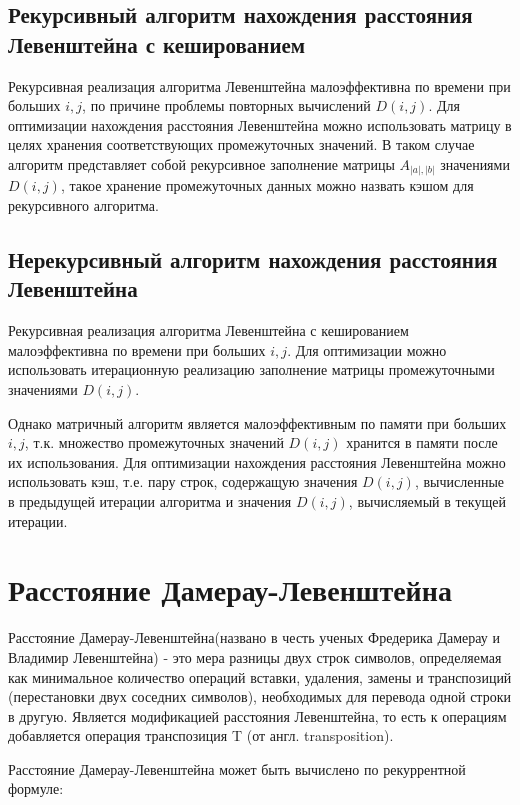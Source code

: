 \subsection{Рекурсивный алгоритм нахождения расстояния Левенштейна с кешированием}

Рекурсивная реализация алгоритма Левенштейна малоэффективна по времени при больших $i, j$, по причине проблемы повторных вычислений $D(i,j)$. Для оптимизации нахождения расстояния Левенштейна можно использовать матрицу в целях хранения соответствующих промежуточных значений. В таком случае алгоритм представляет собой рекурсивное заполнение матрицы $A_{|a|,|b|}$ значениями $D(i,j)$, такое хранение промежуточных данных можно назвать кэшом для рекурсивного алгоритма.

\subsection{Нерекурсивный алгоритм нахождения расстояния Левенштейна}

Рекурсивная реализация алгоритма Левенштейна с кешированием малоэффективна по времени при больших $i, j$. Для оптимизации можно использовать итерационную реализацию заполнение матрицы промежуточными значениями $D(i,j)$.

Однако матричный алгоритм является малоэффективным по памяти при больших $i, j$, т.к. множество промежуточных значений $D(i,j)$ хранится в памяти после их использования. Для оптимизации нахождения расстояния Левенштейна можно использовать кэш, т.е. пару строк, содержащую значения $D(i,j)$, вычисленные в предыдущей итерации алгоритма и значения $D(i,j)$, вычисляемый в текущей итерации.

\section{Расстояние Дамерау-Левенштейна}
Расстояние Дамерау-Левенштейна(названо в честь ученых Фредерика Дамерау и Владимир Левенштейна) - это мера разницы двух строк символов, определяемая как минимальное количество операций вставки, удаления, замены и транспозиций (перестановки двух соседних символов), необходимых для перевода одной строки в другую. Является модификацией расстояния Левенштейна, то есть к операциям добавляется операция транспозиция T (от англ. transposition).

Расстояние Дамерау-Левенштейна может быть вычислено по рекуррентной формуле:

